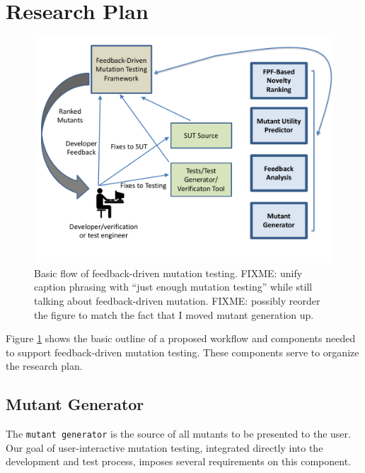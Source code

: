 \section{Research Plan}

\begin{figure}
\centering
\includegraphics[width=0.8\columnwidth]{TestFlow}

\caption{Basic flow of feedback-driven mutation testing. FIXME: unify caption
  phrasing with ``just enough mutation testing'' while still talking about
  feedback-driven mutation. FIXME: possibly reorder the figure to match the fact
  that I moved mutant generation up. }
\label{fig:flow}
\end{figure}

Figure \ref{fig:flow} shows the basic outline of a proposed workflow
and components needed to support feedback-driven mutation testing.
These components serve to organize the research plan.

\subsection{Mutant Generator}
\label{sec:anylangplan}

The {\tt mutant generator} is the source of all mutants to be presented to the
user.  Our goal of user-interactive mutation testing, integrated directly into
the development and test process, imposes several requirements on this
component. 


